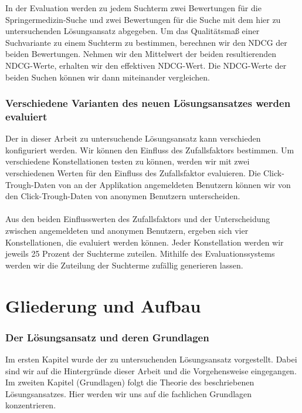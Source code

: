 In der Evaluation werden zu jedem Suchterm zwei Bewertungen für die Springermedizin-Suche und zwei Bewertungen für die Suche mit dem hier zu untersuchenden Lösungsansatz abgegeben. Um das Qualitätsmaß einer Suchvariante zu einem Suchterm zu bestimmen, berechnen wir den NDCG der beiden Bewertungen. Nehmen wir den Mittelwert der beiden resultierenden NDCG-Werte, erhalten wir den effektiven NDCG-Wert. Die NDCG-Werte der beiden Suchen können wir dann miteinander vergleichen.

\subsubsection{Verschiedene Varianten des neuen Lösungsansatzes werden evaluiert}
\label{sec:Einfuehrung:Methodik:Evaluation:EvaluationsdatenVarianteLoesungsansatzes}

Der in dieser Arbeit zu untersuchende Lösungsansatz kann verschieden konfiguriert werden. Wir können den Einfluss des Zufallsfaktors bestimmen. Um verschiedene Konstellationen testen zu können, werden wir mit zwei verschiedenen Werten für den Einfluss des Zufallsfaktor evaluieren. Die Click-Trough-Daten von an der Applikation angemeldeten Benutzern können wir von den Click-Trough-Daten von anonymen Benutzern unterscheiden.
\\
\\
Aus den beiden Einflusswerten des Zufallsfaktors und der Unterscheidung zwischen angemeldeten und anonymen Benutzern, ergeben sich vier Konstellationen, die evaluiert werden können. Jeder Konstellation werden wir jeweils 25 Prozent der Suchterme zuteilen. Mithilfe des Evaluationssystems werden wir die Zuteilung der Suchterme zufällig generieren lassen.

\section{Gliederung und Aufbau}
\label{sec:Einfuehrung:GliederungAufbau}

\subsubsection{Der Lösungsansatz und deren Grundlagen}
\label{sec:Einfuehrung:GliederungAufbau:Loesungsansatz}

Im ersten Kapitel wurde der zu untersuchenden Lösungsansatz vorgestellt. Dabei sind wir auf die Hintergründe dieser Arbeit und die Vorgehensweise eingegangen. Im zweiten Kapitel (Grundlagen) folgt die Theorie des beschriebenen Lösungsansatzes. Hier werden wir uns auf die fachlichen Grundlagen konzentrieren. 

